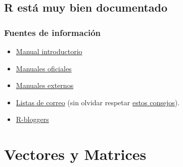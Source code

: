 \documentclass[xcolor={usenames,svgnames,dvipsnames}]{beamer}
\begin{document}
\subsection{R está muy bien documentado}
\label{sec-1-3}
\begin{frame}
\frametitle{Fuentes de información}
\label{sec-1-3-1}

\begin{itemize}
\item \href{http://cran.r-project.org/doc/manuals/R-intro.html}{Manual introductorio}
\item \href{http://cran.r-project.org/manuals.html}{Manuales oficiales}
\item \href{http://cran.r-project.org/other-docs.html}{Manuales externos}
\item \href{http://www.r-project.org/mail.html}{Listas de correo} (sin olvidar respetar \href{http://www.r-project.org/posting-guide.html}{estos consejos}).
\item \href{http://www.r-bloggers.com}{R-bloggers}
\end{itemize}
\end{frame}
\section{Vectores y Matrices}
\label{sec-2}
\end{document}
